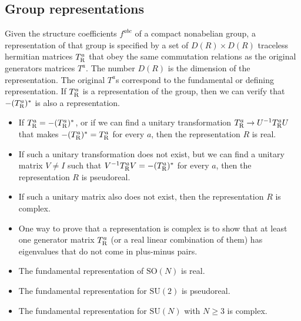 \subsection{Group representations}
Given the structure coefficients $f^{abc}$ of a compact nonabelian group, a representation of that group is specified by a set of $D(R)\times D(R)$ traceless hermitian matrices $T^a_{\rm R}$ that obey the same commutation relations as the original generators matrices $T^a$.
The number $D(R)$ is the dimension of the representation. The original $T^a$s correspond to the fundamental or defining representation.
If $T^a_{\rm R}$ is a representation of the group, then we can verify that  $-(T^a_{\rm R})^*$ is also a representation. 
\begin{itemize}
\item If $T^a_{\rm R} = -(T^a_{\rm R})^*$, or if we can find a unitary transformation $T^a_{\rm R} \to U^{-1}T^a_{\rm R}U$ that makes $-(T^a_{\rm R})^* = T^a_{\rm R}$ for every $a$, then the representation $R$ is real.
\item If such a unitary transformation does not exist, but we can find a unitary matrix $V \neq I$ such that $V^{-1}T^a_{\rm R}V = -(T^a_{\rm R})^*$ for every $a$, then the representation $R$ is pseudoreal.
\item If such a unitary matrix also does not exist, then the representation $R$ is complex.
\item One way to prove that a representation is complex is to show that at least one generator matrix $T^a_{\rm R}$ (or a real linear combination of them) has eigenvalues that do not come in plus-minus pairs.
\end{itemize}

\begin{example}
\begin{itemize}
\item The fundamental representation of $\mathrm{SO}(N)$ is real.
\item The fundamental representation for $\mathrm{SU}(2)$ is pseudoreal.
\item The fundamental representation for $\mathrm{SU}(N)$ with $N \geq 3$ is complex.
\end{itemize}
\end{example}

